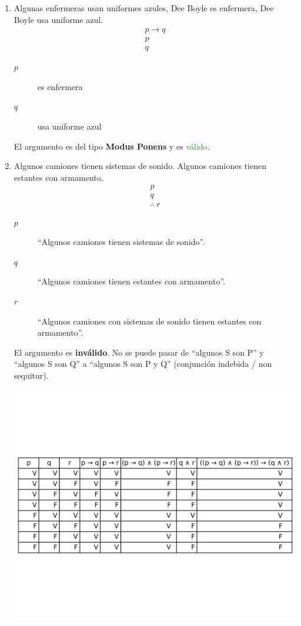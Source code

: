 \documentclass[12pt,letterpaper]{exam}
\begin{document}
\begin{enumerate}
\begin{enumerate}[label=\alph*)]
\item Algunas enfermeras usan uniformes azules, Dee Boyle es enfermera, Dee Boyle usa uniforme azul.
\[
\begin{array}{c}
p \to q \\
p \\
\hline
q
\end{array}
\]
\begin{description}
  \item[$p$] es enfermera
  \item[$q$] usa uniforme azul
\end{description}

El argumento es del tipo \textbf{Modus Ponens} y es \textcolor{ForestGreen}{válido}.

\item Algunos camiones tienen sistemas de sonido.
      Algunos camiones tienen estantes con armamento.
\[
\begin{array}{l}
p\\
q\\
\hline
\therefore\ r
\end{array}
\]
\begin{description}
  \item[$p$] “Algunos camiones tienen sistemas de sonido”.
  \item[$q$] “Algunos camiones tienen estantes con armamento”.
  \item[$r$] “Algunos camiones con sistemas de sonido tienen estantes con armamento”.
\end{description}

El argumento es \textbf{inválido}. No se puede pasar de “algunos S son P” y 
“algunos S son Q” a “algunos S son P y Q” (conjunción indebida / non sequitur).
\begin{center}
    \includegraphics[height=0.4\textheight]{../assets/Talleres_fundamentos/Taller2_ejercicio_k.png}
  \end{center}

\end{enumerate}
\end{enumerate}
\end{document}
